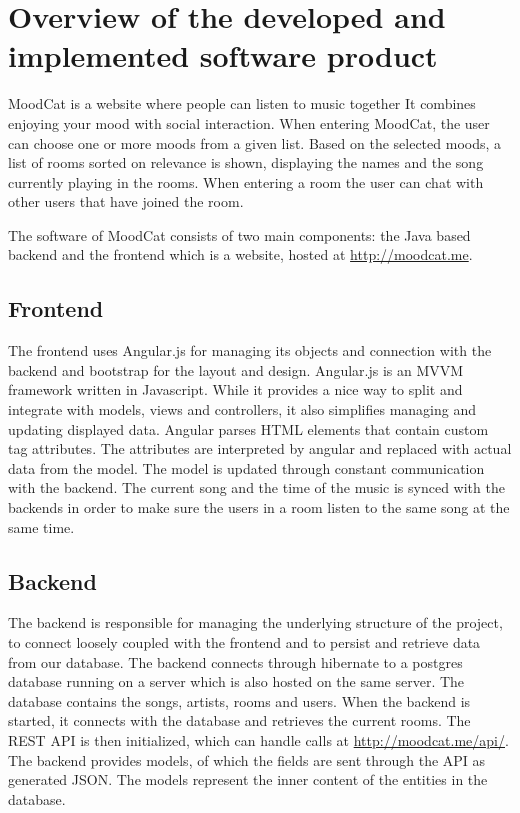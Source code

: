 \chapter{Overview of the developed and implemented software product}

MoodCat is a website where people can listen to music together
It combines enjoying your mood with social interaction.
When entering MoodCat, the user can choose one or more moods from a given list.
Based on the selected moods, a list of rooms sorted on relevance is shown, displaying the names and the song currently playing in the rooms. 
When entering a room the user can chat with other users that have joined the room.

The software of MoodCat consists of two main components: the Java based backend and the frontend which is a website,
hosted at \url{http://moodcat.me}.

\section{Frontend}
The frontend uses Angular.js for managing its objects and connection with the backend and bootstrap for the layout and design.
Angular.js is an MVVM framework written in Javascript.
While it provides a nice way to split and integrate with models, views and controllers, it also simplifies managing and updating displayed data.
Angular parses HTML elements that contain custom tag attributes.
The attributes are interpreted by angular and replaced with actual data from the model.
The model is updated through constant communication with the backend.
The current song and the time of the music is synced with the backends in order to make sure the users in a room listen to the same song at the same time.

\section{Backend}
The backend is responsible for managing the underlying structure of the project, to connect loosely coupled with the frontend and to persist and retrieve data from our database.
The backend connects through hibernate to a postgres database running on a server which is also hosted on the same server.
The database contains the songs, artists, rooms and users.
When the backend is started, it connects with the database and retrieves the current rooms.
The REST API is then initialized, which can handle calls at \url{http://moodcat.me/api/}.
The backend provides models, of which the fields are sent through the API as generated JSON.
The models represent the inner content of the entities in the database.

